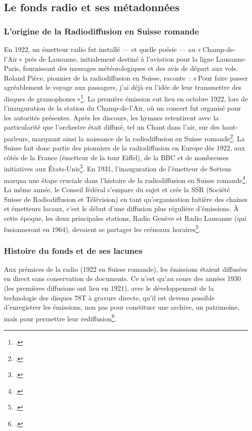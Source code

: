 \subsection{Le fonds radio et ses métadonnées}
\subsubsection{L'origine de la Radiodiffusion en Suisse romande}

En 1922, un émetteur radio fut installé — et quelle poésie — au « Champ-de-l’Air » près de Lausanne, initialement destiné à l’aviation pour la ligne Lausanne-Paris, fournissant des messages météorologiques et des avis de départ aux vols. Roland Pièce, pionnier de la radiodiffusion en Suisse, raconte : « Pour faire passer agréablement le voyage aux passagers, j’ai déjà eu l’idée de leur transmettre des disques de gramophones »\footcite{1939}. La première émission eut lieu en octobre 1922, lors de l’inauguration de la station du Champ-de-l’Air, où un concert fut organisé pour les autorités présentes. Après les discours, les hymnes retentirent avec la particularité que l’orchestre était diffusé, tel un Chant dans l’air, sur des haut-parleurs, marquant ainsi la naissance de la radiodiffusion en Suisse romande\footcite{1939}. La Suisse fait donc partie des pionniers de la radiodiffusion en Europe dès 1922, aux côtés de la France (émetteur de la tour Eiffel), de la BBC et de nombreuses initiatives aux États-Unis\footcite{2022a}. 
En 1931, l’inauguration de l’émetteur de Sottens marqua une étape cruciale dans l’histoire de la radiodiffusion en Suisse romande\footcite{zotero-256}. La même année, le Conseil fédéral s’empare du sujet et crée la SSR (Société Suisse de Radiodiffusion et Télévision) en tant qu’organisation faitière des chaines et émetteurs locaux, c’est le début d’une diffusion plus régulière d’émissions. À cette époque, les deux principales stations, Radio Genève et Radio Lausanne (qui fusionneront en 1964), devaient se partager les créneaux horaires\footcite{2022a}.

\subsubsection{Histoire du fonds et de ses lacunes}


Aux prémices de la radio (1922 en Suisse romande), les émissions étaient diffusées en direct sans conservation de documents. Ce n’est qu’au cours des années 1930 (les premières diffusions ont lieu en 1921), avec le développement de la technologie des disques 78T à gravure directe, qu’il est devenu possible d’enregistrer les émissions, non pas pour constituer une archive, un patrimoine, mais pour permettre leur rediffusion\footcite[p. 26]{prongue2009}.

